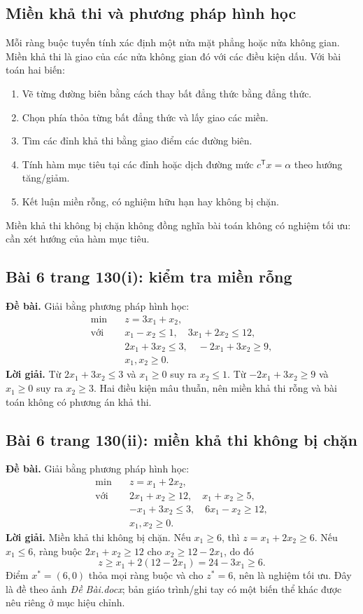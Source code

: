 \documentclass[11pt,a4paper]{article}
\newcommand{\T}{^{\mathsf T}}
\begin{document}
\subsection{Miền khả thi và phương pháp hình học}
Mỗi ràng buộc tuyến tính xác định một nửa mặt phẳng hoặc nửa không gian. Miền khả thi là giao của các nửa không gian đó với các điều kiện dấu. Với bài toán hai biến:
\begin{enumerate}
\item Vẽ từng đường biên bằng cách thay bất đẳng thức bằng đẳng thức.
\item Chọn phía thỏa từng bất đẳng thức và lấy giao các miền.
\item Tìm các đỉnh khả thi bằng giao điểm các đường biên.
\item Tính hàm mục tiêu tại các đỉnh hoặc dịch đường mức \(c\T x=\alpha\) theo hướng tăng/giảm.
\item Kết luận miền rỗng, có nghiệm hữu hạn hay không bị chặn.
\end{enumerate}
Miền khả thi không bị chặn không đồng nghĩa bài toán không có nghiệm tối ưu: cần xét hướng của hàm mục tiêu.

\subsection{Bài 6 trang 130(i): kiểm tra miền rỗng}
\textbf{Đề bài.} Giải bằng phương pháp hình học:
\[
\begin{aligned}
\min\quad &z=3x_1+x_2,\\
\text{với}\quad
&x_1-x_2\le1,\quad 3x_1+2x_2\le12,\\
&2x_1+3x_2\le3,\quad -2x_1+3x_2\ge9,\\
&x_1,x_2\ge0.
\end{aligned}
\]
\textbf{Lời giải.} Từ \(2x_1+3x_2\le3\) và \(x_1\ge0\) suy ra \(x_2\le1\). Từ \(-2x_1+3x_2\ge9\) và \(x_1\ge0\) suy ra \(x_2\ge3\). Hai điều kiện mâu thuẫn, nên miền khả thi rỗng và bài toán không có phương án khả thi.

\subsection{Bài 6 trang 130(ii): miền khả thi không bị chặn}
\textbf{Đề bài.} Giải bằng phương pháp hình học:
\[
\begin{aligned}
\min\quad &z=x_1+2x_2,\\
\text{với}\quad
&2x_1+x_2\ge12,\quad x_1+x_2\ge5,\\
&-x_1+3x_2\le3,\quad 6x_1-x_2\ge12,\\
&x_1,x_2\ge0.
\end{aligned}
\]
\textbf{Lời giải.} Miền khả thi không bị chặn. Nếu \(x_1\ge6\), thì \(z=x_1+2x_2\ge6\). Nếu \(x_1\le6\), ràng buộc \(2x_1+x_2\ge12\) cho \(x_2\ge12-2x_1\), do đó
\[
z\ge x_1+2(12-2x_1)=24-3x_1\ge6.
\]
Điểm \(x^*=(6,0)\) thỏa mọi ràng buộc và cho \(z^*=6\), nên là nghiệm tối ưu. Đây là đề theo ảnh \textit{Đề Bài.docx}; bản giáo trình/ghi tay có một biến thể khác được nêu riêng ở mục hiệu chỉnh.
\end{document}
